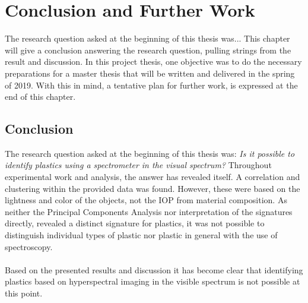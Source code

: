 \chapter{Conclusion and Further Work}
\label{chap:conclusion}
The research question asked at the beginning of this thesis was... This chapter will give a conclusion answering the research question, pulling strings from the result and discussion. In this project thesis, one objective was to do the necessary preparations for a master thesis that will be written and delivered in the spring of 2019. With this in mind, a tentative plan for further work, is expressed at the end of this chapter. 


\section{Conclusion}
The research question asked at the beginning of this thesis was: \textit{Is it possible to identify plastics using a spectrometer in the visual spectrum?} Throughout experimental work and analysis, the answer has revealed itself. A correlation and clustering within the provided data was found. However, these were based on the lightness and color of the objects, not the IOP from material composition. As neither the Principal Components Analysis nor interpretation of the signatures directly, revealed a distinct signature for plastics, it was not possible to distinguish individual types of plastic nor plastic in general with the use of spectroscopy.
\\\\
Based on the presented results and discussion it has become clear that identifying plastics based on hyperspectral imaging in the visible spectrum is not possible at this point. 

